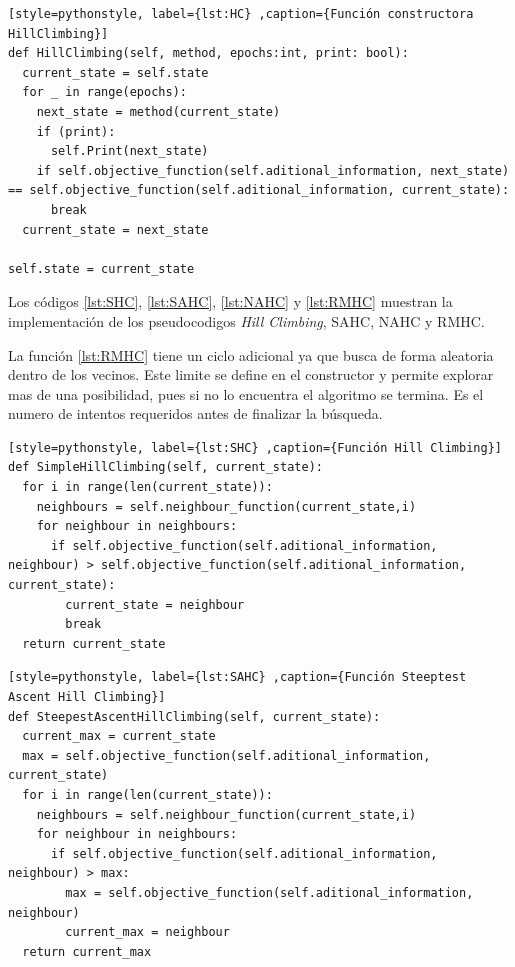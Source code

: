 \documentclass[12pt,twoside]{article}
\begin{document}
\begin{lstlisting}[style=pythonstyle, label={lst:HC} ,caption={Función constructora HillClimbing}]
def HillClimbing(self, method, epochs:int, print: bool):
  current_state = self.state
  for _ in range(epochs):
    next_state = method(current_state)
    if (print):
      self.Print(next_state)
    if self.objective_function(self.aditional_information, next_state) == self.objective_function(self.aditional_information, current_state):
      break
  current_state = next_state

self.state = current_state
\end{lstlisting}

Los códigos \ref{lst:SHC}, \ref{lst:SAHC}, \ref{lst:NAHC} y \ref{lst:RMHC} muestran la implementación de los pseudocodigos \textit{Hill Climbing}, SAHC, NAHC y RMHC.

La función \ref{lst:RMHC} tiene un ciclo adicional ya que busca de forma aleatoria dentro de los vecinos. Este limite se define en el constructor y permite explorar mas de una posibilidad, pues si no lo encuentra el algoritmo se termina. Es el numero de intentos requeridos antes de finalizar la búsqueda.

\begin{lstlisting}[style=pythonstyle, label={lst:SHC} ,caption={Función Hill Climbing}]
def SimpleHillClimbing(self, current_state):
  for i in range(len(current_state)):
    neighbours = self.neighbour_function(current_state,i)
    for neighbour in neighbours:
      if self.objective_function(self.aditional_information, neighbour) > self.objective_function(self.aditional_information, current_state):
      	current_state = neighbour
        break    
  return current_state
\end{lstlisting}

\begin{lstlisting}[style=pythonstyle, label={lst:SAHC} ,caption={Función Steeptest Ascent Hill Climbing}]
def SteepestAscentHillClimbing(self, current_state):
  current_max = current_state
  max = self.objective_function(self.aditional_information, current_state)
  for i in range(len(current_state)):
    neighbours = self.neighbour_function(current_state,i)
    for neighbour in neighbours:
      if self.objective_function(self.aditional_information, neighbour) > max:
        max = self.objective_function(self.aditional_information, neighbour)
        current_max = neighbour
  return current_max
\end{lstlisting}
\end{document}
